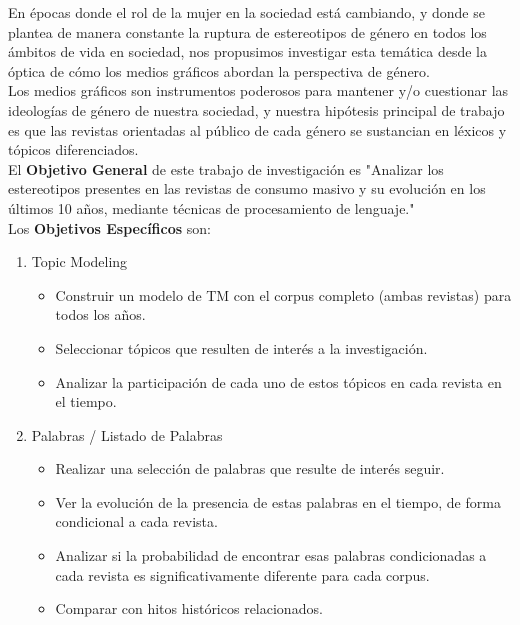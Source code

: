 \documentclass[a4paper]{article}
\begin{document}
En \'epocas donde el rol de la mujer en la sociedad est\'a cambiando, y donde se plantea de manera constante la ruptura de estereotipos de g\'enero en todos los \'ambitos de vida en sociedad, nos propusimos investigar esta tem\'atica desde la \'optica de c\'omo los medios gr\'aficos abordan la perspectiva de g\'enero.\\
Los medios gr\'aficos son instrumentos poderosos para mantener y/o cuestionar las ideolog\'ias de g\'enero de nuestra sociedad, y nuestra hip\'otesis principal de trabajo es que las revistas orientadas al p\'ublico de cada g\'enero se sustancian en l\'exicos y t\'opicos diferenciados.\\
\linebreak
El \textbf{Objetivo General} de este trabajo de investigaci\'on es "Analizar los estereotipos presentes en las revistas de consumo masivo y su evoluci\'on en los \'ultimos 10 a\~nos, mediante t\'ecnicas de procesamiento de lenguaje."\\
\linebreak
Los \textbf{Objetivos Espec\'ificos} son:
\begin{enumerate}
	\item Topic Modeling
		\begin{itemize}
		\item Construir un modelo de TM con el corpus completo (ambas revistas) para todos los a\~nos.
        \item Seleccionar t\'opicos que resulten de inter\'es a la investigaci\'on.
        \item Analizar la participaci\'on de cada uno de estos t\'opicos en cada revista en el tiempo.
		\end{itemize}
	\item Palabras / Listado de Palabras
		\begin{itemize}
		\item Realizar una selecci\'on de palabras que resulte de inter\'es seguir.
        \item Ver la evoluci\'on de la presencia de estas palabras en el tiempo, de forma condicional a cada revista.
        \item Analizar si la probabilidad de encontrar esas palabras condicionadas a cada revista es significativamente diferente para cada corpus.
        \item Comparar con hitos hist\'oricos relacionados.
\end{itemize}
\end{enumerate}
\end{document}
